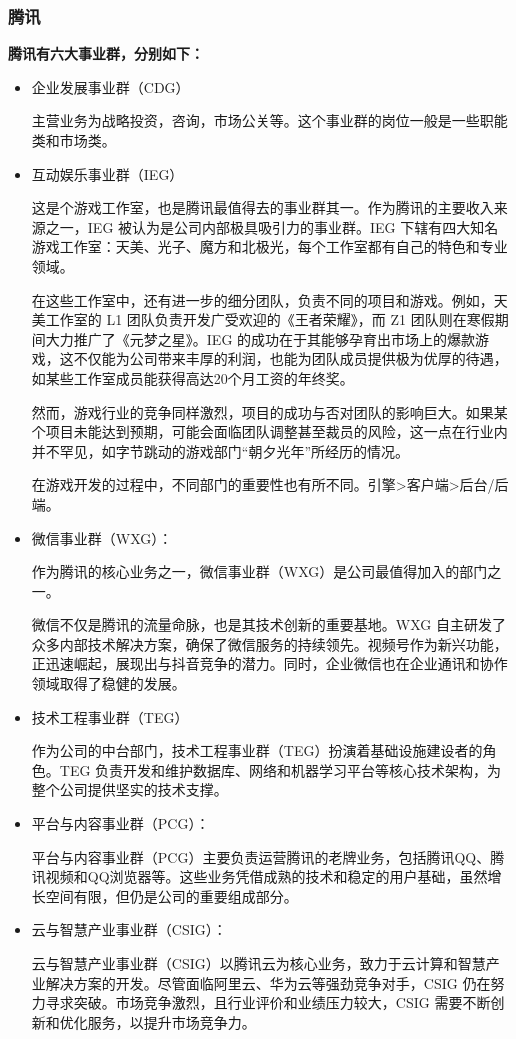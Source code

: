\subsubsection{腾讯}
\textbf{腾讯有六大事业群，分别如下：}
\begin{itemize}
    \item 企业发展事业群（CDG）
    
    主营业务为战略投资，咨询，市场公关等。这个事业群的岗位一般是一些职能类和市场类。
    
    \item 互动娱乐事业群（IEG）
    
    这是个游戏工作室，也是腾讯最值得去的事业群其一。作为腾讯的主要收入来源之一，IEG 被认为是公司内部极具吸引力的事业群。IEG 下辖有四大知名游戏工作室：天美、光子、魔方和北极光，每个工作室都有自己的特色和专业领域。
    
    在这些工作室中，还有进一步的细分团队，负责不同的项目和游戏。例如，天美工作室的 L1 团队负责开发广受欢迎的《王者荣耀》，而 Z1 团队则在寒假期间大力推广了《元梦之星》。IEG 的成功在于其能够孕育出市场上的爆款游戏，这不仅能为公司带来丰厚的利润，也能为团队成员提供极为优厚的待遇，如某些工作室成员能获得高达20个月工资的年终奖。

    然而，游戏行业的竞争同样激烈，项目的成功与否对团队的影响巨大。如果某个项目未能达到预期，可能会面临团队调整甚至裁员的风险，这一点在行业内并不罕见，如字节跳动的游戏部门“朝夕光年”所经历的情况。
    
    在游戏开发的过程中，不同部门的重要性也有所不同。引擎>客户端>后台/后端。
    \item 微信事业群（WXG）：
    
    作为腾讯的核心业务之一，微信事业群（WXG）是公司最值得加入的部门之一。
    
    微信不仅是腾讯的流量命脉，也是其技术创新的重要基地。WXG 自主研发了众多内部技术解决方案，确保了微信服务的持续领先。视频号作为新兴功能，正迅速崛起，展现出与抖音竞争的潜力。同时，企业微信也在企业通讯和协作领域取得了稳健的发展。
    \item 技术工程事业群（TEG）
    
    作为公司的中台部门，技术工程事业群（TEG）扮演着基础设施建设者的角色。TEG 负责开发和维护数据库、网络和机器学习平台等核心技术架构，为整个公司提供坚实的技术支撑。
    \item 平台与内容事业群（PCG）：
    
    平台与内容事业群（PCG）主要负责运营腾讯的老牌业务，包括腾讯QQ、腾讯视频和QQ浏览器等。这些业务凭借成熟的技术和稳定的用户基础，虽然增长空间有限，但仍是公司的重要组成部分。
    \item 云与智慧产业事业群（CSIG）：
    
    云与智慧产业事业群（CSIG）以腾讯云为核心业务，致力于云计算和智慧产业解决方案的开发。尽管面临阿里云、华为云等强劲竞争对手，CSIG 仍在努力寻求突破。市场竞争激烈，且行业评价和业绩压力较大，CSIG 需要不断创新和优化服务，以提升市场竞争力。
\end{itemize}
